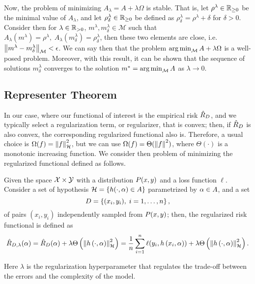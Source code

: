 Now, the problem of minimizing $A_\lambda = A + \lambda \Omega$ is stable. That is, let $\rho^\lambda \in \mathbb{R}_{\geq 0}$ be the minimal value of $A_\lambda$, and let $\rho^\lambda_\delta \in \mathbb{R}_{\geq 0}$ be defined as $\rho^\lambda_\delta = \rho^\lambda + \delta$ for $\delta > 0$. Consider then for $\lambda \in \mathbb{R}_{> 0}$, $m^\lambda, m^\lambda_\delta \in \mathcal{M}$ such that $A_\lambda(m^\lambda) = \rho^\lambda, \; A_\lambda(m^\lambda_\delta) = \rho^\lambda_\delta$, then these two elements are close, i.e. $\left\lVert m^\lambda - m^\lambda_\delta\right\rVert_{\mathcal{M}} < \epsilon$.
%
We can say then that the problem $\operatorname*{arg\min}_{\mathcal{M}} A + \lambda \Omega$ is a well-posed problem. 
%
Moreover, with this result, it can be shown that the sequence of solutions $m^\lambda_\delta$ converges to the solution $m^* = \operatorname*{arg\min}_{\mathcal{M}} A$ as $\lambda \to 0$.






\subsection{Representer Theorem} %
%
In our case, where our functional of interest is the empirical risk $\hat{R}_D$, and we typically select a regularization term, or regularizer, that is convex; then, if $\hat{R}_D$ is also convex, the corresponding regularized functional also is. Therefore, a usual choice is $\Omega(f) = \left\lVert f\right\rVert^2_{\mathcal{H}}$, but we can use $\Omega(f) = \Theta(\left\lVert f\right\rVert^2)$, where $\Theta(\cdot)$ is a monotonic increasing function.
We consider then problem of minimizing the regularized functional defined as follows.
\begin{definition}
    Given the space $\mathcal{X} \times \mathcal{Y}$ with a distribution $P(x, y)$ and a loss function $\ell$. Consider a set of hypothesis $\mathcal{H} = \left\{h(\cdot, \alpha) \in A\right\}$ parametrized by $\alpha \in A$, and a set 
    \begin{equation}
        \nonumber
        D = \left\{(x_i, y_i), \; i=1, \ldots, n\right\} ,
    \end{equation}
    of pairs $(x_i, y_i)$ independently sampled from $P(x, y)$;    
    then, the regularized risk functional is defined as
    \begin{equation}
        \label{eq:regrisk_def}
        \regrisk(\param) = \emprisk(\param) + \lambda \Theta\left(\norm{\hyp{\cdot}{\param}}^2_\hypspace \right) = \frac{1}{\nsamples} \sum_{i=1}^\nsamples \ell(y_i, \hyp{x_i}{\param}) + \lambda \Theta\left(\norm{\hyp{\cdot}{\param}}^2_\hypspace \right) .
    \end{equation}
\end{definition}
%
Here $\lambda$ is the regularization hyperparameter that regulates the trade-off between the errors and the complexity of the model.


